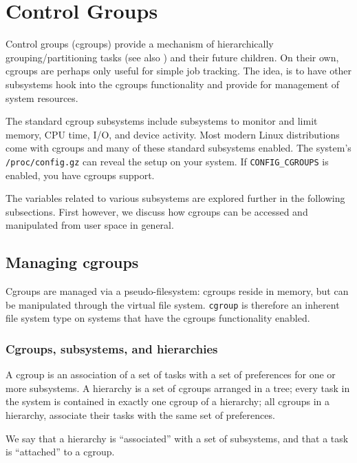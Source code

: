 

\section{Control Groups}

Control groups (cgroups) provide a mechanism of hierarchically
grouping/partitioning tasks (see also
) and their future
children\cite{cgroups.txt}. On their own, cgroups are perhaps only useful for
simple job tracking. The idea, is to have other subsystems hook into the
cgroups functionality and provide for management of system resources.

The standard cgroup subsystems include subsystems to monitor and limit memory,
CPU time, I/O, and device activity. Most modern Linux distributions come with
cgroups and many of these standard subsystems enabled. The system's
\texttt{/proc/config.gz} can reveal the setup on your system\cite{man-5-proc}.
If \texttt{CONFIG\_CGROUPS} is enabled, you have cgroups support.

The variables related to various subsystems are explored further in the
following subsections. First however, we discuss how cgroups can be accessed
and manipulated from user space in general.

\subsection{Managing cgroups}

Cgroups are managed via a pseudo-filesystem: cgroups reside in memory, but can
be manipulated through the virtual file system.  \texttt{cgroup} is therefore
an inherent file system type on systems that have the cgroups functionality
enabled.

\subsubsection{Cgroups, subsystems, and hierarchies}

A cgroup is an association of a set of tasks with a set of preferences for one
or more subsystems.  A hierarchy is a set of cgroups arranged in a tree; every
task in the system is contained in exactly one cgroup of a hierarchy; all
cgroups in a hierarchy, associate their tasks with the same set of preferences.

We say that a hierarchy is ``associated'' with a set of subsystems, and that a
task is ``attached'' to a cgroup.

